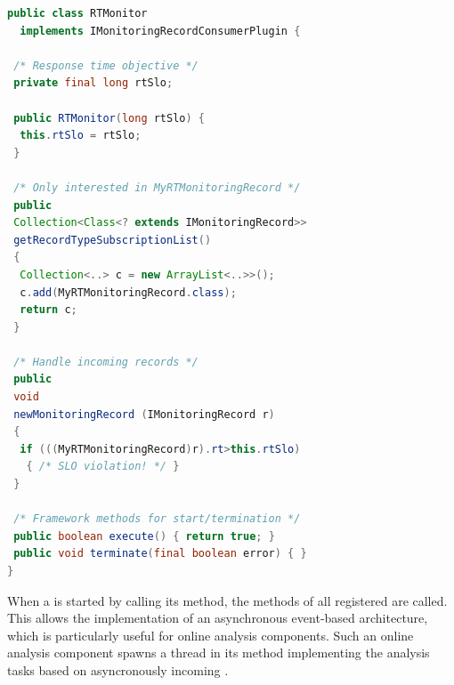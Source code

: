 \begin{lstlisting}[float,language=Java, caption=Example response time monitor, label=lst:rtMonitor,escapechar=\%]
public class RTMonitor
  implements IMonitoringRecordConsumerPlugin {

 /* Response time objective */
 private final long rtSlo;

 public RTMonitor(long rtSlo) {
  this.rtSlo = rtSlo;
 }

 /* Only interested in MyRTMonitoringRecord */
 public 
 Collection<Class<? extends IMonitoringRecord>>
 getRecordTypeSubscriptionList()
 {
  Collection<..> c = new ArrayList<..>>(); 
  c.add(MyRTMonitoringRecord.class);
  return c;
 }

 /* Handle incoming records */
 public 
 void 
 newMonitoringRecord (IMonitoringRecord r) 
 {
  if (((MyRTMonitoringRecord)r).rt>this.rtSlo) 
   { /* SLO violation! */ }
 }

 /* Framework methods for start/termination */
 public boolean execute() { return true; }
 public void terminate(final boolean error) { }
}
\end{lstlisting}

When a \TpanInstance{} is started by calling its  method, the
 methods of all registered \MonitoringRecordConsumers{} %
are called. %
This allows the implementation of an asynchronous event-based architecture,
which is particularly useful for online analysis components. %
Such an online analysis component spawns a thread in its  %
method implementing the analysis tasks based on asyncronously incoming \MonitoringRecords{}. %
